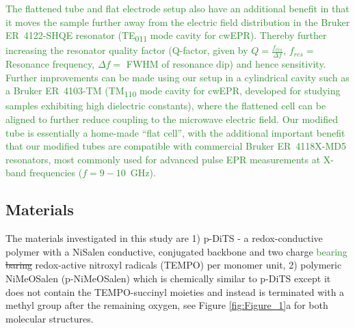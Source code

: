 \documentclass{WileyMSP-template}
\newcommand{\np}[1]{\textcolor{ForestGreen}{#1}}
\newcommand{\ik}[1]{\textcolor{RawSienna}{#1}}
\begin{document}
\bigbreak

\np{
The flattened tube and flat electrode setup also have an additional benefit in that it moves the sample further away from the electric field distribution in the Bruker ER~4122-SHQE resonator (TE\textsubscript{011} mode cavity for cwEPR). Thereby further increasing the resonator quality factor (Q-factor, given by $Q = \frac{f_{res}}{\Delta f}$, $f_{res} =$ Resonance frequency, $\Delta f =$ FWHM of resonance dip) and hence sensitivity. Further improvements can be made using our setup in a cylindrical cavity such as a Bruker ER~4103-TM (TM\textsubscript{110} mode cavity for cwEPR, developed for studying samples exhibiting high dielectric constants), where the flattened cell can be aligned to further reduce coupling to the microwave electric field. Our modified tube is essentially a home-made ``flat cell'', with the additional important benefit that our modified tubes are compatible with commercial Bruker ER~4118X-MD5 resonators, most commonly used for advanced pulse EPR measurements at X-band frequencies ($f = 9-10$~GHz).
}

\bigbreak

\subsection*{Materials}

\ik{The materials investigated in this study are 1) p-DiTS - a redox-conductive polymer with a NiSalen conductive, conjugated backbone and two charge \np{bearing} \sout{baring} redox-active nitroxyl radicals (TEMPO) per monomer unit, 2) polymeric NiMeOSalen (p-NiMeOSalen) which is chemically similar to p-DiTS except it does not contain the TEMPO-succinyl moieties and instead is terminated with a methyl group after the remaining oxygen, see Figure \ref{fig:Figure_1}a for both molecular structures.}

\bigbreak
\end{document}
